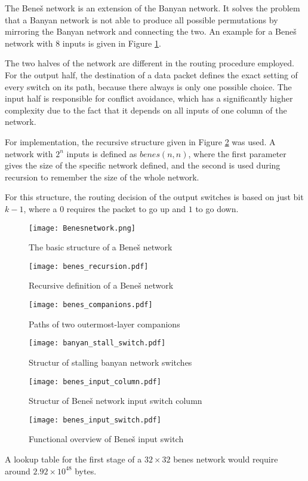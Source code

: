 The Beneš network is an extension of the Banyan network.
It solves the problem that a Banyan network is not able to produce all possible permutations by mirroring the Banyan network and connecting the two.
An example for a Beneš network with 8 inputs is given in Figure \ref{fig:benes}.

The two halves of the network are different in the routing procedure employed.
For the output half, the destination of a data packet defines the exact setting of every switch on its path, because there always is only one possible choice.
The input half is responsible for conflict avoidance, which has a significantly higher complexity due to the fact that it depends on all inputs of one column of the network.

For implementation, the recursive structure given in Figure \ref{fig:benes_recursion} was used.
A network with $2^n$ inputs is defined as $benes(n, n)$, where the first parameter gives the size of the specific network defined, and the second is used during recursion to remember the size of the whole network.

For this structure, the routing decision of the output switches is based on just bit $k - 1$, where a $0$ requires the packet to go up and $1$ to go down.

\begin{figure}[!ht]
	\centering
	\texttt{[image: Benesnetwork.png]}
	\caption{The basic structure of a Beneš network}
	\label{fig:benes}
\end{figure}


\begin{figure}[!ht]
	\centering
	\texttt{[image: benes\_recursion.pdf]}
	\caption{Recursive definition of a Beneš network}
	\label{fig:benes_recursion}
\end{figure}

\begin{figure}[!ht]
	\centering
	\texttt{[image: benes\_companions.pdf]}
	\caption{Paths of two outermost-layer companions}
	\label{fig:benes_companions}
\end{figure}

\begin{figure}[!ht]
	\centering
	\texttt{[image: banyan\_stall\_switch.pdf]}
	\caption{Structur of stalling banyan network switches}
	\label{fig:banyan_stall_switch}
\end{figure}

\begin{figure}[!ht]
	\centering
	\texttt{[image: benes\_input\_column.pdf]}
	\caption{Structur of Beneš network input switch column}
	\label{fig:benes_switchcolumn_in}
\end{figure}

\begin{figure}[!ht]
	\centering
	\texttt{[image: benes\_input\_switch.pdf]}
	\caption{Functional overview of Beneš input switch}
	\label{fig:benes_switch_in}
\end{figure}

 A lookup table for the first stage of a $32\times32$ benes network would require around $2.92\times10^{48}$ bytes.

